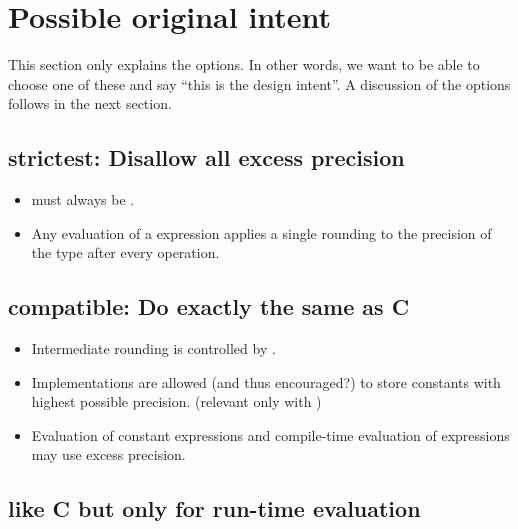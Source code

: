 \section{Possible original intent}

This section only explains the options.
In other words, we want to be able to choose one of these and say “this is the
design intent”.
A discussion of the options follows in the next section.

\subsection{strictest: Disallow all excess precision}\label{o:1}

\begin{itemize}
  \item {} must always be .

  \item Any evaluation of a \fp expression applies a single rounding to the
    precision of the \fp type after every operation.
\end{itemize}

\subsection{compatible: Do exactly the same as C}\label{o:2}

\begin{itemize}
  \item Intermediate rounding is controlled by .

  \item Implementations are allowed (and thus encouraged?) to store constants
    with highest possible precision. (relevant only with )

  \item Evaluation of constant expressions and compile-time evaluation of
    expressions may use excess precision.
\end{itemize}

\subsection{like C but only for run-time evaluation}\label{o:3}

